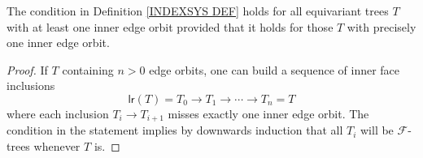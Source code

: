 \documentclass[a4paper,10pt]{article}%
\begin{document}
\begin{lemma}
	The condition in Definition \ref{INDEXSYS DEF}
	holds for all equivariant trees $T$ with at least one inner edge orbit provided that it holds for those $T$ with precisely one inner edge orbit.
\end{lemma}


\begin{proof}
If $T$ containing $n>0$ edge orbits, one can build a sequence of inner face inclusions
	\[
		\mathsf{lr}(T) = T_0
		\to
		T_1
			\to 
		\cdots
			\to
		T_n= T
	\]
where each inclusion $T_i \to T_{i+1}$ misses exactly one inner edge orbit. The condition in the statement implies by downwards induction that all $T_i$ will be $\mathcal{F}$-trees whenever $T$ is.
\end{proof}
\end{document}
